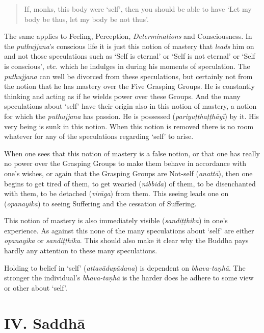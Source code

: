 \begin{quote}
If, monks, this body were `self', then you should be able to have `Let my body be thus, let my body be not thus'.
\end{quote}

The same applies to Feeling, Perception, \textit{Determinations} and Consciousness. In the \textit{puthujjana}'s conscious life it is just this notion of mastery that \emph{leads} him on and not those speculations such as `Self is eternal' or `Self is not eternal' or `Self is conscious', etc. which he indulges in during his moments of speculation. The \textit{puthujjana} can well be divorced from these speculations, but certainly not from the notion that he has mastery over the Five Grasping Groups. He is constantly thinking and acting as if he wields power over these Groups. And the many speculations about `self' have their origin also in this notion of mastery, a notion for which the \textit{puthujjana} has passion. He is possessed (\textit{pariyuṭṭhaṭṭhāyī}) by it. His very being is sunk in this notion. When this notion is removed there is no room whatever for any of the speculations regarding `self' to arise.

When one sees that this notion of mastery is a false notion, or that one has really no power over the Grasping Groups to make them behave in accordance with one's wishes, or again that the Grasping Groups are Not-self (\textit{anattā}), then one begins to get tired of them, to get wearied (\textit{nibbida}) of them, to be disenchanted with them, to be detached (\textit{virāga}) from them. This seeing leads one on (\textit{opanayika}) to seeing Suffering and the cessation of Suffering.

This notion of mastery is also immediately visible (\textit{sandiṭṭhika}) in one's experience. As against this none of the many speculations about `self' are either \textit{opanayika} or \textit{sandiṭṭhika}. This should also make it clear why the Buddha pays hardly any attention to these many speculations.

Holding to belief in `self' (\textit{attavādupādana}) is dependent on \textit{bhava-taṇhā}. The stronger the individual's \textit{bhava-taṇhā} is the harder does he adhere to some view or other about `self'.

\hypertarget{_iv_saddhux101}{%
\section{IV. Saddhā}\label{_iv_saddhux101}}

